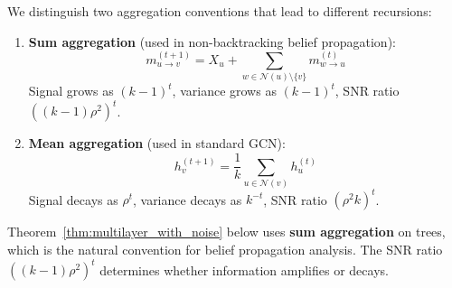 \begin{remark}
\label{rem:normalization_convention}
We distinguish two aggregation conventions that lead to different recursions:
\begin{enumerate}
    \item \textbf{Sum aggregation} (used in non-backtracking belief propagation):
    \begin{equation}
        m_{u \to v}^{(t+1)} = X_u + \sum_{w \in \mathcal{N}(u) \setminus \{v\}} m_{w \to u}^{(t)}
    \end{equation}
    Signal grows as $(k-1)^t$, variance grows as $(k-1)^t$, SNR ratio $((k-1)\rho^2)^t$.

    \item \textbf{Mean aggregation} (used in standard GCN):
    \begin{equation}
        h_v^{(t+1)} = \frac{1}{k} \sum_{u \in \mathcal{N}(v)} h_u^{(t)}
    \end{equation}
    Signal decays as $\rho^t$, variance decays as $k^{-t}$, SNR ratio $(\rho^2 k)^t$.
\end{enumerate}

Theorem~\ref{thm:multilayer_with_noise} below uses \textbf{sum aggregation} on trees, which is the natural convention for belief propagation analysis. The SNR ratio $((k-1)\rho^2)^t$ determines whether information amplifies or decays.
\end{remark}

